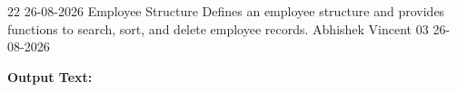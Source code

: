 \clearpage
\label{prog:22}
\programhead
  {22}
  {26-08-2026}
  {Employee Structure}
  {Defines an employee structure and provides functions to search, sort, and delete employee records.}
  {Abhishek Vincent}
  {03}
  {26-08-2026}

\divider
\textbf{Output Text:}\par
\vspace{2pt}

